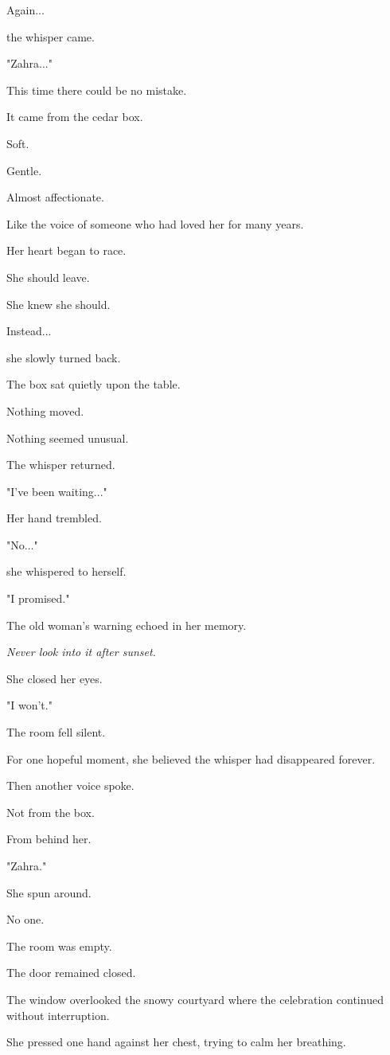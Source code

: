\documentclass[12pt,openany]{book}
\begin{document}
Again...

the whisper came.

"Zahra..."

This time there could be no mistake.

It came from the cedar box.

Soft.

Gentle.

Almost affectionate.

Like the voice of someone who had loved her for many years.

Her heart began to race.

She should leave.

She knew she should.

Instead...

she slowly turned back.

The box sat quietly upon the table.

Nothing moved.

Nothing seemed unusual.

The whisper returned.

"I've been waiting..."

Her hand trembled.

"No..."

she whispered to herself.

"I promised."

The old woman's warning echoed in her memory.

\emph{Never look into it after sunset.}

She closed her eyes.

"I won't."

The room fell silent.

For one hopeful moment, she believed the whisper had disappeared forever.

Then another voice spoke.

Not from the box.

From behind her.

"Zahra."

She spun around.

No one.

The room was empty.

The door remained closed.

The window overlooked the snowy courtyard where the celebration continued without interruption.

She pressed one hand against her chest, trying to calm her breathing.
\end{document}
